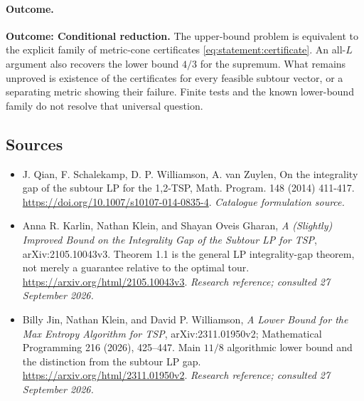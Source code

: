\documentclass[11pt,a4paper]{article}
\numberwithin{equation}{section}
\begin{document}
\paragraph{Outcome.}
\textbf{Outcome: Conditional reduction.}
The upper-bound problem is equivalent to the explicit family of
metric-cone certificates \eqref{eq:statement:certificate}. An all-$L$ argument
also recovers the lower bound $4/3$ for the supremum. What remains
unproved is existence of the certificates for every feasible subtour
vector, or a separating metric showing their failure. Finite tests and
the known lower-bound family do not resolve that universal question.

\subsection{Sources}
\begin{itemize}\raggedright
\item[\textnormal{[S1]}]\hypertarget{source:statement:1}{} J. Qian, F. Schalekamp, D. P. Williamson, A. van Zuylen, On the integrality gap of the subtour LP for the 1,2-TSP, Math. Program. 148 (2014) 411-417.
\url{https://doi.org/10.1007/s10107-014-0835-4}.
{\small\textit{Catalogue formulation source.}}
\item[\textnormal{[E1]}]\hypertarget{extra:statement:1}{} Anna R. Karlin, Nathan Klein, and Shayan Oveis Gharan, \emph{A (Slightly) Improved Bound on the Integrality Gap of the Subtour LP for TSP}, arXiv:2105.10043v3. Theorem 1.1 is the general LP integrality-gap theorem, not merely a guarantee relative to the optimal tour.
\url{https://arxiv.org/html/2105.10043v3}.
{\small\textit{Research reference; consulted 27 September 2026.}}
\item[\textnormal{[E2]}]\hypertarget{extra:statement:2}{} Billy Jin, Nathan Klein, and David P. Williamson, \emph{A Lower Bound for the Max Entropy Algorithm for TSP}, arXiv:2311.01950v2; Mathematical Programming 216 (2026), 425--447. Main $11/8$ algorithmic lower bound and the distinction from the subtour LP gap.
\url{https://arxiv.org/html/2311.01950v2}.
{\small\textit{Research reference; consulted 27 September 2026.}}
\end{itemize}
\end{document}
